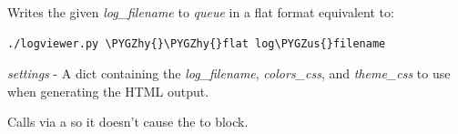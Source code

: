 \documentclass[letterpaper,10pt,openany]{sphinxmanual}
\def\PYGZus{\char`\_}
\def\PYGZhy{\char`\-}
\begin{document}

\begin{fulllineitems}
\label{Applications/terminal/plugin_logging:logging_plugin._retrieve_log_flat}
Writes the given \emph{log\_filename} to \emph{queue} in a flat format equivalent to:

\begin{Verbatim}[commandchars=\\\{\}]
./logviewer.py \PYGZhy{}\PYGZhy{}flat log\PYGZus{}filename
\end{Verbatim}

\emph{settings} - A dict containing the \emph{log\_filename}, \emph{colors\_css}, and
\emph{theme\_css} to use when generating the HTML output.

\end{fulllineitems}


\begin{fulllineitems}
\label{Applications/terminal/plugin_logging:logging_plugin.retrieve_log_playback}
Calls {\hyperref[Applications/terminal/plugin_logging:logging_plugin._retrieve_log_playback]{}} via a
 so it doesn't cause the
 to block.

\end{fulllineitems}

\end{document}
